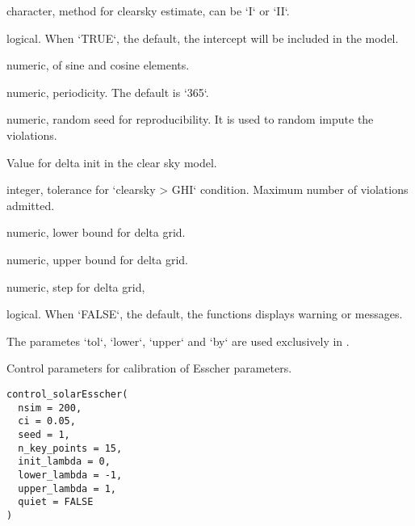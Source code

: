 \documentclass[a4paper]{book}
\begin{document}
%
\begin{Arguments}
\begin{ldescription}
\item[\code{method}] character, method for clearsky estimate, can be `I` or `II`.

\item[\code{include.intercept}] logical. When `TRUE`, the default, the intercept will be included in the model.

\item[\code{order}] numeric, of sine and cosine elements.

\item[\code{period}] numeric, periodicity. The default is `365`.

\item[\code{seed}] numeric, random seed for reproducibility. It is used to random impute the violations.

\item[\code{delta\_init}] Value for delta init in the clear sky model.

\item[\code{tol}] integer, tolerance for `clearsky > GHI` condition. Maximum number of violations admitted.

\item[\code{lower}] numeric, lower bound for delta grid.

\item[\code{upper}] numeric, upper bound for delta grid.

\item[\code{by}] numeric, step for delta grid,

\item[\code{quiet}] logical. When `FALSE`, the default, the functions displays warning or messages.
\end{ldescription}
\end{Arguments}
%
\begin{Details}\relax
The parametes `tol`, `lower`, `upper` and `by` are used exclusively in .
\end{Details}
%
\begin{Description}\relax
Control parameters for calibration of Esscher parameters.
\end{Description}
%
\begin{Usage}
\begin{verbatim}
control_solarEsscher(
  nsim = 200,
  ci = 0.05,
  seed = 1,
  n_key_points = 15,
  init_lambda = 0,
  lower_lambda = -1,
  upper_lambda = 1,
  quiet = FALSE
)
\end{verbatim}
\end{Usage}
\end{document}
